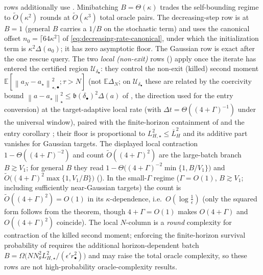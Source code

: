 \documentclass[11pt]{article}
\theoremstyle{plain}
\theoremstyle{definition}
\theoremstyle{remark}
\newcommand{\E}{\mathbb{E}}
\newcommand{\norm}[1]{\left\lVert #1\right\rVert}
\newcommand{\barLH}{\overline{L}_H}
\newcommand{\Ureg}{\mathcal{U}}
\newcommand{\LHs}{L_{H,\star}}
\begin{document}
\begin{table}[t]
{rows additionally use . Minibatching $B=\Theta(\kappa)$ trades the
self-bounding regime to $\widetilde O(\kappa^2)$ rounds at $\widetilde O(\kappa^3)$ total oracle
pairs. The decreasing-step row is at $B=1$ (general $B$ carries a $1/B$ on the stochastic term) and
uses the canonical offset $n_0=\lceil64\kappa^2\rceil$ of \eqref{eq:decreasing-rate-canonical}, under
which the initialization term is $\kappa^2\Delta(a_0)$; it has zero asymptotic floor. The Gaussian
row is exact after the one rescue query. The two \emph{local (non-exit)} rows
() apply once the iterate has entered the certified region
$\Ureg_{\delta_\bullet}$: they control the non-exit (killed) second moment
$\E[\norm{a_N-a_\star}_{\star,\bullet}^2;\tau{>}N]$ (not $\E\Delta_N$; on $\Ureg_{\delta_\bullet}$ these
are related by the coercivity bound $\norm{a-a_\star}_\star^2\leq\mathfrak b(\delta_\bullet)^2\Delta(a)$
of , the direction used for the entry conversion) at the
target-adaptive local rate (with $\Delta t=\Theta((4+\Gamma)^{-1})$ under the universal window),
paired with the finite-horizon containment of  and the entry corollary
; their floor is proportional to $\LHs^2\leq\barLH^2$ and its additive part
vanishes for Gaussian targets. The displayed local contraction $1-\Theta((4+\Gamma)^{-2})$ and count
$\widetilde O((4+\Gamma)^2)$ are the large-batch branch $B\gtrsim V_1$; for general $B$ they read
$1-\Theta\bigl((4+\Gamma)^{-2}\min\{1,B/V_1\}\bigr)$ and $\widetilde O\bigl((4+\Gamma)^2\max\{1,V_1/B\}\bigr)$
(). In the small-$\Gamma$ regime ($\Gamma=O(1)$, $B\gtrsim V_1$; including
sufficiently near-Gaussian targets) the count is $\widetilde O((4+\Gamma)^2)=O(1)$ in its
$\kappa$-dependence, i.e.\ $O(\log\tfrac1\epsilon)$ (only the squared form follows from the theorem,
though $4+\Gamma=O(1)$ makes $O(4+\Gamma)$ and $O((4+\Gamma)^2)$ coincide). The local $N$-column is a
\emph{round} complexity for contraction of the killed second moment; enforcing the finite-horizon
survival probability of  requires the additional horizon-dependent batch
$B=\Omega\bigl(N N_\theta^2\LHs^2/(\epsilon' r_\bullet^2)\bigr)$ and may raise the total oracle
complexity, so these rows are not high-probability oracle-complexity results.}
\label{tab:complexity}
\end{table}
\end{document}
